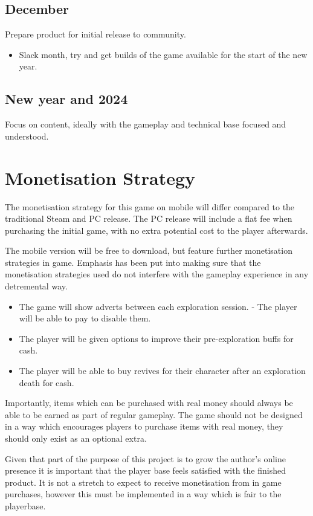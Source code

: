 \documentclass[a4paper]{scrreprt}
\begin{document}
\subsection{December}
Prepare product for initial release to community.

    \begin{itemize}
        \item Slack month, try and get builds of the game available for the start of the new year.
    \end{itemize}

\subsection{New year and 2024}
Focus on content, ideally with the gameplay and technical base focused and understood.

\section{Monetisation Strategy}
The monetisation strategy for this game on mobile will differ compared to the traditional Steam and PC release.
The PC release will include a flat fee when purchasing the initial game, with no extra potential cost to the player afterwards.

The mobile version will be free to download, but feature further monetisation strategies in game.
Emphasis has been put into making sure that the monetisation strategies used do not interfere with the gameplay experience in any detremental way.

    \begin{itemize}
        \item The game will show adverts between each exploration session. - The player will be able to pay to disable them.
        \item The player will be given options to improve their pre-exploration buffs for cash.
        \item The player will be able to buy revives for their character after an exploration death for cash.
    \end{itemize}

Importantly, items which can be purchased with real money should always be able to be earned as part of regular gameplay.
The game should not be designed in a way which encourages players to purchase items with real money, they should only exist as an optional extra.

Given that part of the purpose of this project is to grow the author's online presence it is important that the player base feels satisfied with the finished product.
It is not a stretch to expect to receive monetisation from in game purchases, however this must be implemented in a way which is fair to the playerbase.
\end{document}
